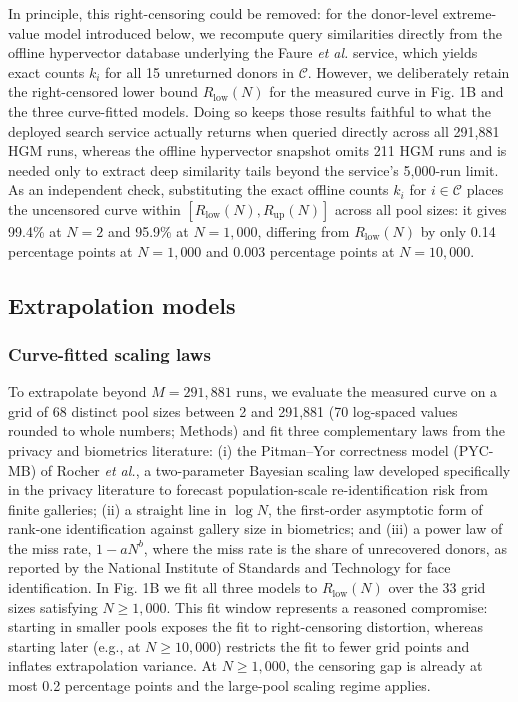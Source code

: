 \documentclass[11pt,a4paper]{article}
\begin{document}
In principle, this right-censoring could be removed: for the donor-level extreme-value model introduced below, we recompute query similarities directly from the offline hypervector database underlying the Faure \textit{et al.} service, which yields exact counts $k_i$ for all 15 unreturned donors in $\mathcal{C}$. However, we deliberately retain the right-censored lower bound $R_{\mathrm{low}}(N)$ for the measured curve in Fig. 1B and the three curve-fitted models. Doing so keeps those results faithful to what the deployed search service actually returns when queried directly across all 291,881 HGM runs, whereas the offline hypervector snapshot omits 211 HGM runs and is needed only to extract deep similarity tails beyond the service's 5,000-run limit. As an independent check, substituting the exact offline counts $k_i$ for $i \in \mathcal{C}$ places the uncensored curve within $[R_{\mathrm{low}}(N), R_{\mathrm{up}}(N)]$ across all pool sizes: it gives 99.4\% at $N = 2$ and 95.9\% at $N = 1{,}000$, differing from $R_{\mathrm{low}}(N)$ by only 0.14 percentage points at $N = 1{,}000$ and 0.003 percentage points at $N = 10{,}000$.

\subsection*{Extrapolation models}

\subsubsection*{Curve-fitted scaling laws}

To extrapolate beyond $M = 291{,}881$ runs, we evaluate the measured curve on a grid of 68 distinct pool sizes between 2 and 291,881 (70 log-spaced values rounded to whole numbers; Methods) and fit three complementary laws from the privacy and biometrics literature: (i) the Pitman--Yor correctness model (PYC-MB) of Rocher \textit{et al.}\cite{rocher2025}, a two-parameter Bayesian scaling law developed specifically in the privacy literature to forecast population-scale re-identification risk from finite galleries; (ii) a straight line in $\log N$, the first-order asymptotic form of rank-one identification against gallery size in biometrics\cite{baveja2010}; and (iii) a power law of the miss rate, $1 - a N^{b}$, where the miss rate is the share of unrecovered donors, as reported by the National Institute of Standards and Technology for face identification\cite{grother2019}. In Fig. 1B we fit all three models to $R_{\mathrm{low}}(N)$ over the 33 grid sizes satisfying $N \ge 1{,}000$. This fit window represents a reasoned compromise: starting in smaller pools exposes the fit to right-censoring distortion, whereas starting later (e.g., at $N \ge 10{,}000$) restricts the fit to fewer grid points and inflates extrapolation variance. At $N \ge 1{,}000$, the censoring gap is already at most 0.2 percentage points and the large-pool scaling regime applies.
\end{document}
